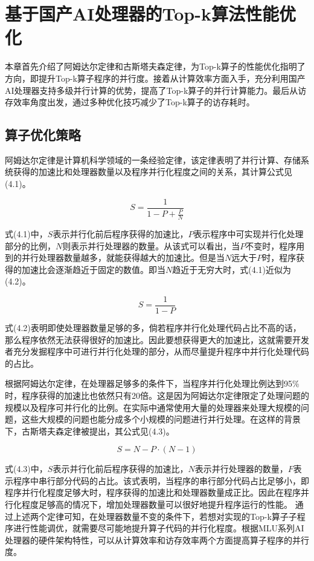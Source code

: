 \chapter{基于国产AI处理器的Top-k算法性能优化}


本章首先介绍了阿姆达尔定律和古斯塔夫森定律，为Top-k算子的性能优化指明了方向，即提升Top-k算子程序的并行度。接着从计算效率方面入手，充分利用国产AI处理器支持多级并行计算的优势，提高了Top-k算子的并行计算能力。最后从访存效率角度出发，通过多种优化技巧减少了Top-k算子的访存耗时。

\section{算子优化策略}

阿姆达尔定律是计算机科学领域的一条经验定律，该定律表明了并行计算、存储系统获得的加速比和处理器数量以及程序并行化程度之间的关系，其计算公式见(4.1)。

\begin{equation}
S = \frac{1}{1 - P + \frac{P}{N}}
\label{eq:4.1}
\end{equation}

式(4.1)中，$S$表示并行化前后程序获得的加速比，$P$表示程序中可实现并行化处理部分的比例，$N$则表示并行处理器的数量。从该式可以看出，当$P$不变时，程序用到的并行处理器数量越多，就能获得越大的加速比。但是当$N$远大于$P$时，程序获得的加速比会逐渐趋近于固定的数值。即当$N$趋近于无穷大时，式(4.1)近似为(4.2)。

\begin{equation}
S = \frac{1}{1 - P}
\label{eq:4.2}
\end{equation}

式(4.2)表明即使处理器数量足够的多，倘若程序并行化处理代码占比不高的话，那么程序依然无法获得很好的加速比。因此要想获得更大的加速比，这就需要开发者充分发掘程序中可进行并行化处理的部分，从而尽量提升程序中并行化处理代码的占比。

根据阿姆达尔定律，在处理器足够多的条件下，当程序并行化处理比例达到95\%时，程序获得的加速比也依然只有20倍。这是因为阿姆达尔定律限定了处理问题的规模以及程序可并行化的比例。在实际中通常使用大量的处理器来处理大规模的问题，这些大规模的问题也能分成多个小规模的问题进行并行处理。在这样的背景下，古斯塔夫森定律被提出，其公式见(4.3)。

\begin{equation}
S = N - P \cdot (N - 1)
\label{eq:4.3}
\end{equation}

式(4.3)中，$S$表示并行化前后程序获得的加速比，$N$表示并行处理器的数量，$F$表示程序中串行部分代码的占比。该式表明，当程序的串行部分代码占比足够小，即程序并行化程度足够大时，程序获得的加速比和处理器数量成正比。因此在程序并行化程度足够高的情况下，增加处理器数量可以很好地提升程序运行的性能。
通过上述两个定律可知，在处理器数量不变的条件下，若想对实现的Top-k算子子程序进行性能调优，就需要尽可能地提升算子代码的并行化程度。根据MLU系列AI处理器的硬件架构特性，可以从计算效率和访存效率两个方面提高算子程序的并行度。



